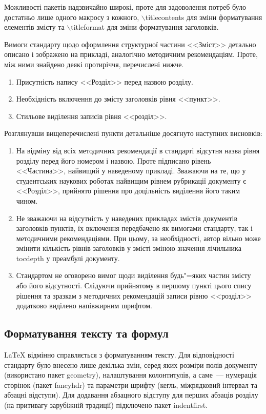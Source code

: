 Можливості пакетів надзвичайно широкі, проте для задоволення потреб було достатньо лише одного макросу з кожного, $\backslash$titlecontents для зміни форматування елементів змісту та $\backslash$titleformat для зміни форматування заголовків.

Вимоги стандарту щодо оформлення структурної частини <<Зміст>> детально описано і зображено на прикладі, аналогічно методичним рекомендаціям. Проте, між ними знайдено деякі протиріччя, перечислені нижче.
\begin{enumerate}
\item Присутність напису <<Розділ>> перед назвою розділу.
\item Необхідність включення до змісту заголовків рівня <<пункт>>.
\item Стильове виділення записів рівня <<розділ>>.
\end{enumerate}

Розглянувши вищеперечислені пункти детальніше досягнуто наступних висновків:
\begin{enumerate}
\item На відміну від всіх методичних рекомендації в стандарті відсутня назва рівня розділу перед його номером і назвою. Проте підписано рівень <<Частина>>, найвищий у наведеному прикладі. Зважаючи на те, що у студентських наукових роботах найвищим рівнем рубрикації документу є <<Розділ>>, прийнято рішення про доцільність виділення його таким чином.
\item Не зважаючи на відсутність у наведених прикладах змістів документів заголовків пунктів, їх включення передбачено як вимогами стандарту, так і методичними рекомендаціями. При цьому, за необхідності, автор вільно може змінити кількість рівнів заголовків у змісті зміною значення лічильника tocdepth у преамбулі документу.
\item Стандартом не оговорено вимог щоди виділення будь"=яких частин змісту або його відсутності. Слідуючи прийнятому в першому пункті цього спису рішення та зразкам з методичних рекомендацій записи рівню <<розділ>> додатково виділено напівжирним шрифтом.
\end{enumerate}

\subsection{Форматування тексту та формул}

\LaTeX{} відмінно справляється з форматуванням тексту. Для відповідності стандарту було внесено лише декілька змін, серед яких розміри полів документу (використано пакет geometry), налаштування колонтитулів, а саме~--- нумерація сторінок (пакет fancyhdr) та параметри шрифту (кегль, міжрядковий інтервал та абзацні відступи). Для додавання абзацного відступу для перших абзаців розділу (на притивагу зарубіжній традиції) підключено пакет indentfirst.

